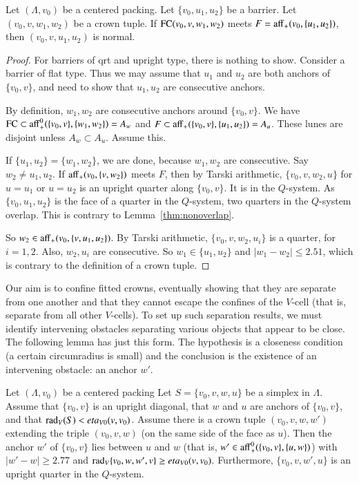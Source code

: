 \begin{lemma}
Let $(\Lambda,v_0)$ be a centered packing.  Let $\{v_0,u_1,u_2\}$
be a barrier.  Let $(v_0,v,w_1,w_2)$ be a crown tuple.  If
${\operatorname{FC}}(v_0,v,w_1,w_2)$ meets $F={\operatorname{aff}}_+(v_0,\{u_1,u_2\})$, then
$(v_0,v,u_1,u_2)$ is normal.
\end{lemma}

\begin{proof} For barriers of qrt and upright type, there is nothing to show.  Consider
a barrier of flat type.  Thus we may assume that $u_1$ and $u_2$ are both anchors of
$\{v_0,v\}$, and need to show that $u_1,u_2$ are consecutive anchors.

By definition, $w_1,w_2$ are consecutive anchors around $\{v_0,v\}$.
We have ${\operatorname{FC}}\subset {\operatorname{aff}}_+^0(\{v_0,v\},\{w_1,w_2\}) = A_w$
and $F\subset {\operatorname{aff}}_+(\{v_0,v\},\{u_1,u_2\}) = A_u$.
These lunes are disjoint unless $A_w \subset A_u$.  Assume this.

If $\{u_1,u_2\}=\{w_1,w_2\}$, we are done, because $w_1,w_2$ are consecutive.
Say $w_2\ne u_1,u_2$.  If ${\operatorname{aff}}_+(v_0,\{v,w_2\})$ meets $F$, then by Tarski arithmetic,
$\{v_0,v,w_2,u\}$ for $u=u_1$ or $u=u_2$ is an upright quarter along $\{v_0,v\}$.  It
is in the $Q$-system.  As $\{v_0,u_1,u_2\}$ is the face of a quarter in the $Q$-system,
two quarters in the $Q$-system overlap. 
This is contrary to Lemma~\ref{thm:nonoverlap}.

So $w_2\in{\operatorname{aff}}_+(v_0,\{v,u_1,u_2\})$.  By Tarski arithmetic,
 $\{v_0,v,w_2,u_i\}$ is a quarter, for
$i=1,2$.  Also, $w_2,u_i$ are consecutive.  So $w_1\in\{u_1,u_2\}$ and $|w_1-w_2|\le 2.51$,
which is contrary to the definition of a crown tuple.
\end{proof}

Our aim is to confine fitted crowns, eventually showing that they are separate
from one another 
and that they cannot escape the confines of the $V$-cell (that is, separate from
all other $V$-cells).  To set up such separation results, we must 
identify intervening obstacles separating various objects that appear to
be close.
The following lemma has just this form.  The hypothesis
is a closeness condition (a certain circumradius is small) and the conclusion is the
existence of an intervening obstacle: an anchor $w'$.

\begin{lemma}
Let $(\Lambda,v_0)$ be a centered packing
  Let $S=\{v_0,v,w,u\}$ be a simplex in $\Lambda$.  Assume that $\{v_0,v\}$ is an
upright diagonal, that $w$ and $u$
are anchors of $\{v_0,v\}$, and that $\operatorname{rad}_V(S)< eta_{V0}(v,v_0)$.
Assume there is a crown tuple $(v_0,v,w,w')$
extending the triple $(v_0,v,w)$
(on the same side of the face as $u$).  
Then the anchor $w'$ of $\{v_0,v\}$ lies between $u$ and $w$
(that is,  $w'\in{\operatorname{aff}}_+^0(\{v_0,v\},\{u,w\})$) with
    $|w'-w|\ge2.77$ and
    $\operatorname{rad}_V\{v_0,w,w',v\} \ge eta_{V0}(v,v_0)$.
Furthermore, $\{v_0,v,w',u\}$ is an upright quarter in the $Q$-system.
\end{lemma}


